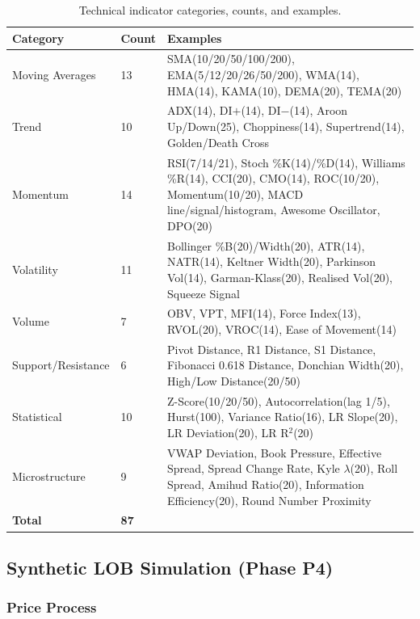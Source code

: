 \documentclass[12pt,a4paper]{article}
\theoremstyle{definition}
\theoremstyle{remark}
\begin{document}
\begin{table}[H]
\centering
\caption{Technical indicator categories, counts, and examples.}
\label{tab:indcats}
\small
\begin{tabular}{ll>{\RaggedRight\arraybackslash}p{8cm}}
\toprule
\textbf{Category} & \textbf{Count} & \textbf{Examples} \\
\midrule
Moving Averages     & 13 &
  SMA(10/20/50/100/200), EMA(5/12/20/26/50/200), WMA(14),
  HMA(14), KAMA(10), DEMA(20), TEMA(20) \\
Trend               & 10 &
  ADX(14), DI$+$(14), DI$-$(14), Aroon Up/Down(25),
  Choppiness(14), Supertrend(14), Golden/Death Cross \\
Momentum            & 14 &
  RSI(7/14/21), Stoch \%K(14)/\%D(14), Williams \%R(14),
  CCI(20), CMO(14), ROC(10/20), Momentum(10/20),
  MACD line/signal/histogram, Awesome Oscillator, DPO(20) \\
Volatility          & 11 &
  Bollinger \%B(20)/Width(20), ATR(14), NATR(14),
  Keltner Width(20), Parkinson Vol(14), Garman-Klass(20),
  Realised Vol(20), Squeeze Signal \\
Volume              & 7  &
  OBV, VPT, MFI(14), Force Index(13), RVOL(20), VROC(14),
  Ease of Movement(14) \\
Support/Resistance  & 6  &
  Pivot Distance, R1 Distance, S1 Distance,
  Fibonacci 0.618 Distance, Donchian Width(20),
  High/Low Distance(20/50) \\
Statistical         & 10 &
  Z-Score(10/20/50), Autocorrelation(lag 1/5), Hurst(100),
  Variance Ratio(16), LR Slope(20), LR Deviation(20), LR R$^2$(20) \\
Microstructure      & 9  &
  VWAP Deviation, Book Pressure, Effective Spread,
  Spread Change Rate, Kyle $\lambda$(20), Roll Spread,
  Amihud Ratio(20), Information Efficiency(20),
  Round Number Proximity \\
\midrule
\textbf{Total} & \textbf{87} & \\
\bottomrule
\end{tabular}
\end{table}

\subsection{Synthetic LOB Simulation (Phase P4)}
\label{sec:sim_methods}

\subsubsection{Price Process}
\end{document}
